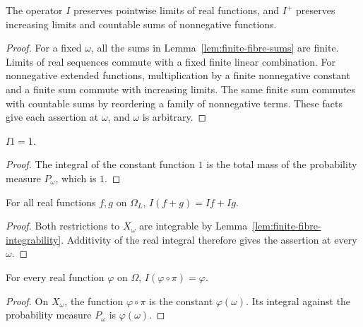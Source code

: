 \begin{lemma}\label{lem:finite-fibre-limits}
\leanok
{}
The operator $I$ preserves pointwise limits of real functions, and
$I^+$ preserves increasing limits and countable sums of nonnegative
functions.
\end{lemma}
\begin{proof}
For a fixed $\omega$, all the sums in
Lemma~\ref{lem:finite-fibre-sums} are finite.
Limits of real sequences commute with a fixed finite linear
combination. For nonnegative extended functions, multiplication by
a finite nonnegative constant and a finite sum commute with increasing
limits. The same finite sum commutes with countable sums by
reordering a family of nonnegative terms. These facts give each
assertion at $\omega$, and $\omega$ is arbitrary.
\end{proof}

\begin{lemma}\label{lem:fibre-one}
\leanok
{}
$I1=1$.
\end{lemma}
\begin{proof}
The integral of the constant function $1$ is the total mass
of the probability measure $P_\omega$, which is $1$.
\end{proof}

\begin{lemma}[Additivity]\label{lem:fibre-additivity}
\leanok
{}
For all real functions $f,g$ on $\Omega_L$, $I(f+g)=If+Ig$.
\end{lemma}
\begin{proof}
Both restrictions to $X_\omega$ are integrable by
Lemma~\ref{lem:finite-fibre-integrability}. Additivity of the real integral
therefore gives the assertion at every $\omega$.
\end{proof}

\begin{corollary}\label{cor:fibre-pullback}
\leanok
{}
For every real function $\varphi$ on $\Omega$, $I(\varphi\circ\pi)=\varphi$.
\end{corollary}
\begin{proof}
On $X_\omega$, the function $\varphi\circ\pi$ is the constant
$\varphi(\omega)$. Its integral against the probability measure
$P_\omega$ is $\varphi(\omega)$.
\end{proof}

